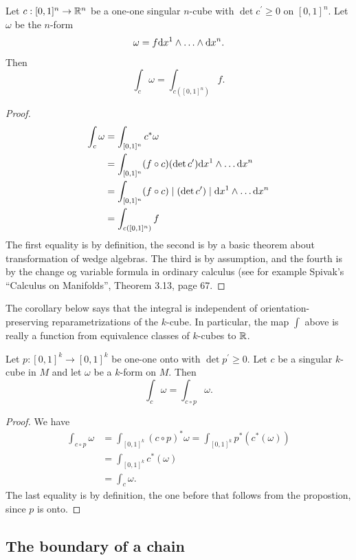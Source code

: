 \documentclass[11pt, english]{article}
\begin{document}
\begin{prop}
  Let $c:[0,1]^n \to \mathbb{R}^n$ be a one-one singular $n$-cube with $\det c^\prime \geq 0$ on $[0,1]^n$. Let $\omega$ be the $n$-form
\[
\omega = f \mathrm{d}{x}^1 \wedge \ldots \wedge \mathrm{d}{x}^n.
\]
Then
\[
\int_c \omega = \int_{c([0,1]^n)} f.
\]
\end{prop}
\begin{proof}
  \begin{align*}
\int_{c} \omega &= \int_{[0,1]^n} c^\ast \omega \\
&= \int_{[0,1]^n} (f \circ c) (\det c^\prime) \mathrm{d}{x}^1 \wedge \ldots \mathrm{d}{x}^n \\
 &= \int_{[0,1]^n} (f \circ c) \mid(\det c^\prime)\mid \mathrm{d}{x}^1 \wedge \ldots \mathrm{d}{x}^n \\
&= \int_{c([0,1]^n)} f
  \end{align*}
The first equality is by definition, the second is by a basic theorem about transformation of wedge algebras. The third is by assumption, and the fourth is by the change og variable formula in ordinary calculus (see for example Spivak's ``Calculus on Manifolds'', Theorem 3.13, page 67.
\end{proof}

The corollary below says that the integral is independent of orientation-preserving reparametrizations of the $k$-cube. In particular, the map $\int$ above is really a function from equivalence classes of $k$-cubes to $\mathbb{R}$. 
\begin{corr}
  Let $p:[0,1]^k \to [0,1]^k$ be  one-one onto with $\det p^\prime \geq 0$. Let $c$ be a singular $k$-cube in $M$ and let $\omega$ be a $k$-form on $M$. Then
\[
\int_c \omega = \int_{c \circ p} \omega.
\]
\end{corr}
\begin{proof}
We have
\begin{align*}
  \int_{c \circ p} \omega &= \int_{[0,1]^k }(c \circ p)^\ast \omega = \int_{[0,1]^k} p^\ast ( c^\ast(\omega)) \\
&= \int_{[0,1]^k} c^\ast(\omega)\\
&= \int_c \omega.
\end{align*}
The last equality is by definition, the one before that follows from the propostion, since $p$ is onto.
\end{proof}

\subsection{The boundary of a chain}
\end{document}
